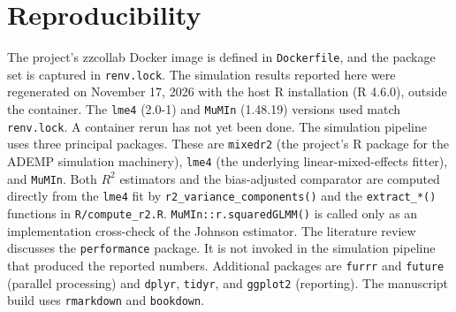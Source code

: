 \documentclass[
  11pt,
]{article}
\begin{document}
\section{Reproducibility}\label{reproducibility}

The project's zzcollab Docker image is defined in \texttt{Dockerfile},
and the package set is captured in \texttt{renv.lock}. The simulation
results reported here were regenerated on November 17, 2026 with
the host R installation (R 4.6.0), outside the container. The
\texttt{lme4} (2.0-1) and \texttt{MuMIn} (1.48.19) versions used match
\texttt{renv.lock}. A container rerun has not yet been done. The
simulation pipeline uses three principal packages. These are
\texttt{mixedr2} (the project's R package for the ADEMP simulation
machinery), \texttt{lme4} (the underlying linear-mixed-effects fitter),
and \texttt{MuMIn}. Both \(R^2\) estimators and the bias-adjusted
comparator are computed directly from the \texttt{lme4} fit by
\texttt{r2\_variance\_components()} and the \texttt{extract\_*()} functions in
\texttt{R/compute\_r2.R}. \texttt{MuMIn::r.squaredGLMM()} is called only as an
implementation cross-check of the Johnson estimator. The
literature review discusses the \texttt{performance} package. It is not
invoked in the simulation pipeline that produced the reported
numbers.
Additional packages are \texttt{furrr} and \texttt{future} (parallel
processing) and \texttt{dplyr}, \texttt{tidyr}, and \texttt{ggplot2} (reporting). The
manuscript build uses \texttt{rmarkdown} and \texttt{bookdown}.
\end{document}
